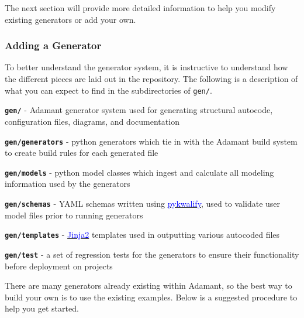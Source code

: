 The next section will provide more detailed information to help you modify existing generators or add your own.

\subsubsection{Adding a Generator} \label{Adding Generators}

To better understand the generator system, it is instructive to understand how the different pieces are laid out in the repository. The following is a description of what you can expect to find in the subdirectories of \texttt{gen/}.

\vspace{5mm} %
\begin{spaceditemize}
  \item \textbf{\texttt{gen/}} - Adamant generator system used for generating structural autocode, configuration files, diagrams, and documentation 
  \item \textbf{\texttt{gen/generators}} - python generators which tie in with the Adamant build system to create build rules for each generated file
  \item \textbf{\texttt{gen/models}} - python model classes which ingest and calculate all modeling information used by the generators
  \item \textbf{\texttt{gen/schemas}} - YAML schemas written using \href{https://pykwalify.readthedocs.io/en/unstable/}{\textcolor{blue}{pykwalify}}, used to validate user model files prior to running generators
  \item \textbf{\texttt{gen/templates}} - \href{http://jinja.pocoo.org}{\textcolor{blue}{Jinja2}} templates used in outputting various autocoded files
  \item \textbf{\texttt{gen/test}} - a set of regression tests for the generators to ensure their functionality before deployment on projects
\end{spaceditemize}
\vspace{5mm} %

There are many generators already existing within Adamant, so the best way to build your own is to use the existing examples. Below is a suggested procedure to help you get started.

